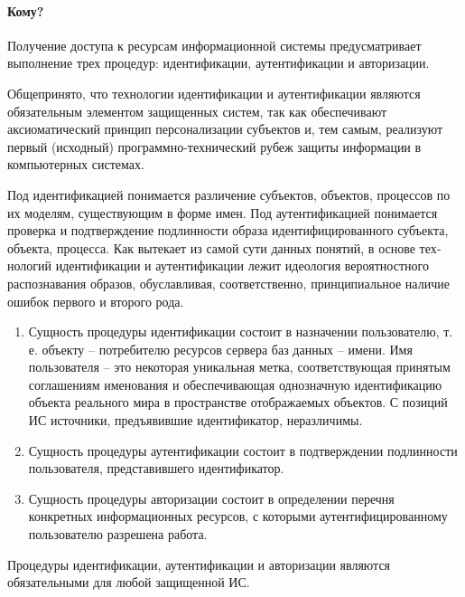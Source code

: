 \paragraph{Кому?}

Получение доступа к ресурсам информационной системы предусматривает выполнение трех процедур: идентификации, аутентификации и авторизации.

Общепринято, что технологии идентификации и аутентификации являются обязательным элементом защищенных систем, так как обеспечивают аксиоматический принцип персонализации субъектов и, тем самым, реализуют первый (исходный) программ­но-технический рубеж защиты информации в компьютерных системах.

Под идентификацией понимается различение субъектов, объектов, процессов по их моделям, существующим в форме имен. Под аутентификацией понимается проверка и подтверждение подлинности образа идентифицированного субъекта, объекта, процесса. Как вытекает из самой сути данных понятий, в основе тех­нологий идентификации и аутентификации лежит идеология вероятностного распознавания образов, обуславливая, соответственно, принципиальное наличие ошибок первого и второго рода. 
\begin{enumerate}
	\item Сущность процедуры идентификации состоит в назначении пользователю, т. е. объекту -- потребителю ресурсов сервера баз данных -- имени. Имя пользователя -- это некоторая уникальная метка, соответствующая принятым соглашениям именования и обеспечивающая однозначную идентификацию объекта реального мира в пространстве отображаемых объектов. С позиций ИС источники, предъявившие идентификатор, неразличимы.
	\item Сущность процедуры аутентификации состоит в подтверждении подлинности пользователя, представившего идентификатор.
	\item Сущность процедуры авторизации состоит в определении перечня конкретных информационных ресурсов, с которыми аутентифицированному пользователю разрешена работа.
	
\end{enumerate}
Процедуры идентификации, аутентификации и авторизации являются обязательными для любой защищенной ИС.

